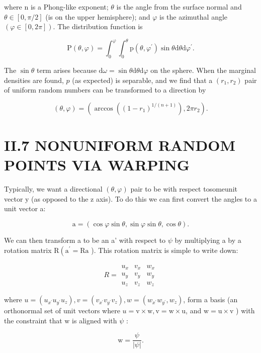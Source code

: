 \begin{CJK}{UTF8}{gbsn}
where $\mathrm{n}$ is a Phong-like exponent; $\theta$ is the angle from the surface normal and $\theta \in[0, \pi / 2]$ (is on the upper hemisphere); and $\varphi$ is the azimuthal angle $(\varphi \in[0,2 \pi])$. The distribution function is

$$
\mathrm{P}(\theta, \varphi)=\int_{0}^{\varphi} \int_{0}^{\theta} \mathrm{p}\left(\theta, \varphi^{\prime}\right) \sin \theta \mathrm{d} \theta \mathrm{d} \varphi^{\prime} .
$$

The $\sin \theta$ term arises because $\mathrm{d} \omega=\sin \theta \mathrm{d} \theta \mathrm{d} \varphi$ on the sphere. When the marginal densities are found, $p$ (as expected) is separable, and we find that a $\left(r_{1}, r_{2}\right)$ pair of uniform random numbers can be transformed to a direction by

$$
(\theta, \varphi)=\left(\arccos \left(\left(1-r_{1}\right)^{1 /(n+1)}\right), 2 \pi r_{2}\right) .
$$

\section{II.7 NONUNIFORM RANDOM POINTS VIA WARPING}
Typically, we want a directional $(\theta, \varphi)$ pair to be with respect tosomeunit vector $\mathrm{y}$ (as opposed to the $\mathrm{z}$ axis). To do this we can first convert the angles to a unit vector a:

$$
\mathrm{a}=(\cos \varphi \sin \theta, \sin \varphi \sin \theta, \cos \theta) .
$$

We can then transform a to be an a' with respect to $\psi$ by multiplying a by a rotation matrix $\mathrm{R}\left(\mathrm{a}^{\prime}=\mathrm{Ra}\right.$ ). This rotation matrix is simple to write down:

$$
R=\begin{array}{lll}
u_{x} & v_{x} & w_{x} \\
u_{y} & v_{y} & w_{y} \\
u_{z} & v_{z} & w_{z}
\end{array}
$$

where $u=\left(u_{x^{\prime}} u_{y^{\prime}} u_{z}\right), v=\left(v_{x^{\prime}} v_{y^{\prime}} v_{z}\right), w=\left(w_{x^{\prime}} w_{y^{\prime}}, w_{z}\right)$, form a basis (an orthonormal set of unit vectors where $u=\mathrm{v} \times \mathrm{w}, \mathrm{v}=\mathrm{w} \times \mathrm{u}$, and $\mathrm{w}=\mathrm{u} \times \mathrm{v}$ ) with the constraint that $\mathrm{w}$ is aligned with $\psi$ :

$$
\mathrm{w}=\frac{\psi}{|\psi|} .
$$


\end{CJK}
